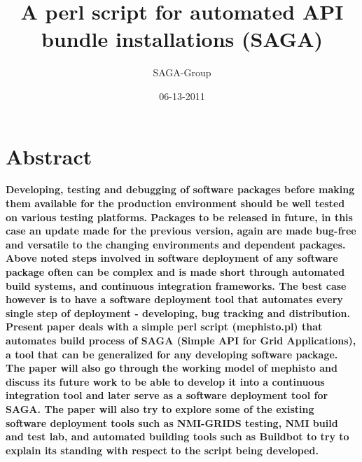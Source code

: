 \documentclass[a4paper,10pt]{article}
\newcommand{\jhanote}[1]{  {\textcolor{red}     { ***Shantenu: #1 }}}
\newcommand{\jhanote}[1]{}
\begin{document}
 \title{ \Large \vspace{-3.5em} A perl script for automated API bundle installations (SAGA)}
 
 \author{\normalsize SAGA-Group}
 \date{\normalsize 06-13-2011}
 \maketitle
 





\section*{\normalsize \textbf{Abstract}}
\textbf{Developing, testing and debugging of software packages before making them available for the production environment should be well 
tested on various testing platforms.  Packages to be released in future, in this case an update made for the previous version, again are
made bug-free and versatile to the changing environments and dependent packages. Above noted steps involved in software deployment of 
any software package often can be complex and is made short through automated build systems, and continuous integration frameworks. 
The best case however is to have a software deployment tool that automates every single step of deployment - developing, bug tracking and distribution. 
Present paper deals with a simple perl script (mephisto.pl) that automates build process of SAGA (Simple API for Grid Applications), 
a tool that can be generalized for any developing software package. The paper will also go through the working model of mephisto and 
discuss its future work to be able to develop it into a continuous integration tool and later serve as a software deployment tool for SAGA. 
The paper will also try to explore some of the existing software deployment tools such as NMI-GRIDS testing, NMI build and test lab, 
and automated building tools such as Buildbot to try to explain its standing with respect to the script being developed. 
}
\end{document}
